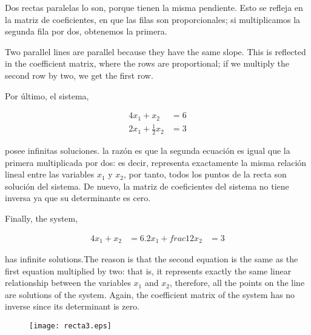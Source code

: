 \begin{paracol}{2}
Dos rectas paralelas lo son, porque tienen la misma pendiente. Esto se refleja en la matriz de coeficientes, en que las filas son proporcionales; si multiplicamos la segunda fila por dos, obtenemos la primera. 

\switchcolumn

Two parallel lines are parallel because they have the same slope. This is reflected in the coefficient matrix, where the rows are proportional; if we multiply the second row by two, we get the first row. 

\switchcolumn
Por último, el sistema,

\begin{align*}
4x_1+x_2&=6\\
2x_1+\frac{1}{2} x_2&=3
\end{align*}

posee infinitas soluciones. la razón es que la segunda ecuación es igual que la primera multiplicada por dos: es decir, representa exactamente la misma relación lineal entre las variables $x_1$ y $x_2$, por tanto, todos los puntos de la recta son solución del sistema. De nuevo, la matriz de coeficientes del sistema no tiene inversa ya que su determinante es cero.

\switchcolumn
Finally, the system,

\begin{align*}
4x_1+x_2&=6.
2x_1+frac{1}{2} x_2&=3
\end{align*}

has infinite solutions.The reason is that the second equation is the same as the first equation multiplied by two: that is, it represents exactly the same linear relationship between the variables $x_1$ and $x_2$, therefore, all the points on the line are solutions of the system. Again, the coefficient matrix of the system has no inverse since its determinant is zero.
\end{paracol}

\begin{figure}[h]
\centering
\texttt{[image: recta3.eps]}
\label{recta3}
\end{figure}

